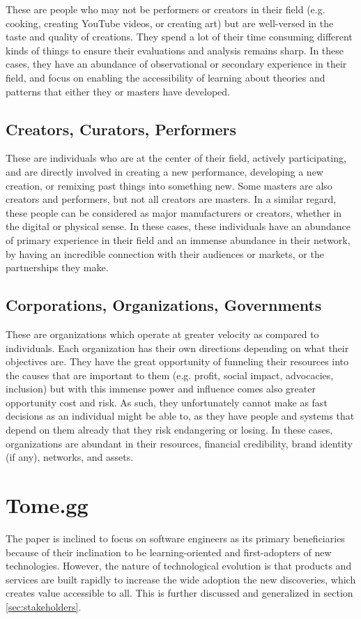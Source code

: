 \documentclass[journal, onecolumn]{IEEEtran}
\begin{document}
These are people who may not be performers or creators in their field (e.g. cooking,
creating YouTube videos, or creating art) but are well-versed in the taste and 
quality of creations. They spend a lot of their time consuming different kinds of
things to ensure their evaluations and analysis remains sharp. In these cases, 
they have an abundance of observational or secondary experience in their field,
and focus on enabling the accessibility of learning about theories and patterns 
that either they or masters have developed.

\subsection{Creators, Curators, Performers}

These are individuals who are at the center of their field, actively participating,
and are directly involved in creating a new performance, developing a new creation, 
or remixing past things into something new. Some masters are also creators and 
performers, but not all creators are masters. In a similar regard, these people can
be considered as major manufacturers or creators, whether in the digital or physical 
sense. In these cases, these individuals have an abundance of primary experience in
their field and an immense abundance in their network, by having an incredible
connection with their audiences or markets, or the partnerships they make.

\subsection{Corporations, Organizations, Governments}

These are organizations which operate at greater velocity as compared to individuals.
Each organization has their own directions depending on what their objectives are.
They have the great opportunity of funneling their resources into the causes that
are important to them (e.g. profit, social impact, advocacies, inclusion) but with
this immense power and influence comes also greater opportunity cost and risk. As
such, they unfortunately cannot make as fast decisions as an individual might be 
able to, as they have people and systems that depend on them already that they risk
endangering or losing. In these cases, organizations are abundant in their resources,
financial credibility, brand identity (if any), networks, and assets.


\section{Tome.gg}
\label{sec:tomegg}
The paper is inclined to focus on software engineers as its primary beneficiaries because of 
their inclination to be learning-oriented and  first-adopters of new technologies.
However, the nature of technological evolution is that products and services are 
built rapidly to increase the wide adoption the new discoveries, which creates value
accessible to all. This is further discussed and generalized in section \ref{sec:stakeholders}.
\end{document}
